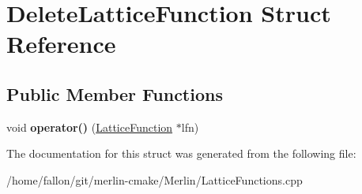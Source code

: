 \hypertarget{structDeleteLatticeFunction}{}\section{Delete\+Lattice\+Function Struct Reference}
\label{structDeleteLatticeFunction}
\subsection*{Public Member Functions}
\begin{DoxyCompactItemize}
\item 
\mbox{\label{structDeleteLatticeFunction_a2a4dfdff879f293827c5704cfb42cc16}} 
void {\bfseries operator()} (\hyperlink{classLatticeFunction}{Lattice\+Function} $\ast$lfn)
\end{DoxyCompactItemize}


The documentation for this struct was generated from the following file\+:\begin{DoxyCompactItemize}
\item 
/home/fallon/git/merlin-\/cmake/\+Merlin/Lattice\+Functions.\+cpp\end{DoxyCompactItemize}
